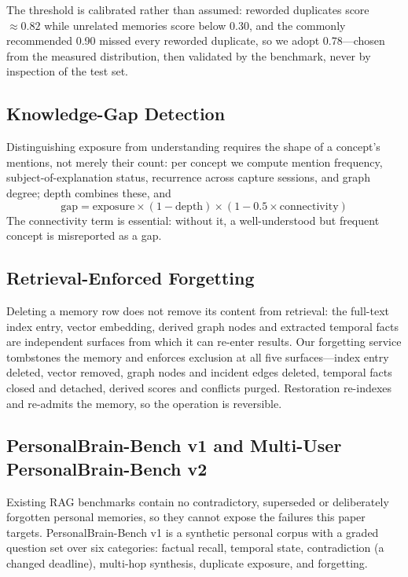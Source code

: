 \documentclass[conference]{IEEEtran}
\begin{document}
The threshold is calibrated rather than assumed: reworded duplicates score $\approx 0.82$ while unrelated memories score below 0.30, and the commonly recommended 0.90 missed every reworded duplicate, so we adopt 0.78---chosen from the measured distribution, then validated by the benchmark, never by inspection of the test set.

\subsection{Knowledge-Gap Detection}
Distinguishing exposure from understanding requires the shape of a concept's mentions, not merely their count: per concept we compute mention frequency, subject-of-explanation status, recurrence across capture sessions, and graph degree; depth combines these, and
\begin{equation}
\mathrm{gap} = \mathrm{exposure} \times (1 - \mathrm{depth}) \times (1 - 0.5 \times \mathrm{connectivity})
\label{eq:gap}
\end{equation}
The connectivity term is essential: without it, a well-understood but frequent concept is misreported as a gap.

\subsection{Retrieval-Enforced Forgetting}
Deleting a memory row does not remove its content from retrieval: the full-text index entry, vector embedding, derived graph nodes and extracted temporal facts are independent surfaces from which it can re-enter results. Our forgetting service tombstones the memory and enforces exclusion at all five surfaces---index entry deleted, vector removed, graph nodes and incident edges deleted, temporal facts closed and detached, derived scores and conflicts purged. Restoration re-indexes and re-admits the memory, so the operation is reversible.

\subsection{PersonalBrain-Bench v1 and Multi-User PersonalBrain-Bench v2}
Existing RAG benchmarks contain no contradictory, superseded or deliberately forgotten personal memories, so they cannot expose the failures this paper targets. PersonalBrain-Bench v1 is a synthetic personal corpus with a graded question set over six categories: factual recall, temporal state, contradiction (a changed deadline), multi-hop synthesis, duplicate exposure, and forgetting.
\end{document}
